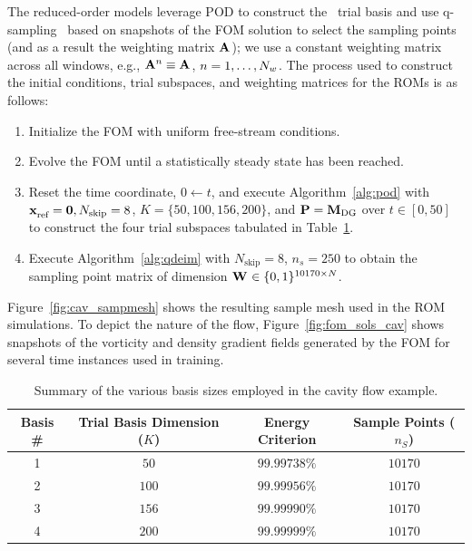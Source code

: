 The reduced-order models leverage POD to construct the \spatialAcronym\ trial basis and use q-sampling~\cite{qdeim_drmac} based on snapshots of the FOM solution to select the sampling points (and as a result the weighting 
matrix $\mathbf{A}^{}$); we use a constant weighting matrix across all windows, e.g., $\mathbf{A}^{n} \equiv \mathbf{A}^{}$, $n=1,\ldots,N_w$. The process used to construct the initial conditions, trial subspaces, and weighting matrices for the ROMs is as follows:
\begin{enumerate}
\item Initialize the FOM with uniform free-stream conditions.
\item Evolve the FOM until a statistically steady state has been reached.
\item Reset the time coordinate, $0 \leftarrow t$, and execute Algorithm~\ref{alg:pod} with $\mathbf{x}_\text{ref}^{} = \boldsymbol 0, N_{\text{skip}} = 8$, $K = \{50,100,156,200\}$, and $\mathbf{P} =  \mathbf{M}_{\text{DG}}$ over $t \in [0,50]$ to construct the four trial subspaces tabulated in Table~\ref{tab:rom_basis_details}. 
\item Execute Algorithm~\ref{alg:qdeim} with $N_{\text{skip}} = 8$, $n_s = 250$ to obtain the sampling point matrix of dimension $\mathbf{W}^{} \in \{0,1\}^{10170 \times N }$. 
\end{enumerate}
Figure~\ref{fig:cav_sampmesh} shows the resulting sample mesh used in the ROM simulations. To depict the nature of the flow, Figure~\ref{fig:fom_sols_cav} shows snapshots of the vorticity and density gradient fields generated by the FOM for several time instances used in training.  
\begin{table}[]
\begin{centering}
\begin{tabular}{c c c c}
\hline
Basis \# & Trial Basis Dimension ($K$) &  Energy Criterion & Sample Points ($n_S$) \\
\hline
1    & $50$ &  $99.99738\%$ & $10170$ \\
2    & $100$ & $99.99956\%$ & $10170$ \\
3    & $156$ & $99.99990\%$ & $10170$ \\
4    & $200$ & $99.99999\%$ & $10170$ \\
\hline
\end{tabular}
\caption{Summary of the various basis sizes employed in the cavity flow example.}
\label{tab:rom_basis_details}
\end{centering}
\end{table}


